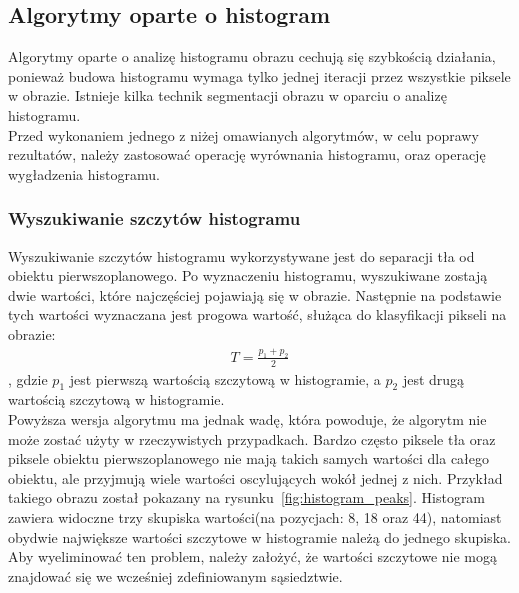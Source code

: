 \subsection{Algorytmy oparte o histogram}
Algorytmy oparte o analizę histogramu obrazu cechują się szybkością działania, ponieważ budowa histogramu wymaga tylko jednej iteracji przez wszystkie piksele w obrazie. Istnieje kilka technik segmentacji obrazu w oparciu o analizę histogramu. \\
Przed wykonaniem jednego z niżej omawianych algorytmów, w celu poprawy rezultatów, należy zastosować operację wyrównania histogramu, oraz operację wygładzenia histogramu.

\subsubsection{Wyszukiwanie szczytów histogramu}
Wyszukiwanie szczytów histogramu wykorzystywane jest do separacji tła od obiektu pierwszoplanowego. Po wyznaczeniu histogramu, wyszukiwane zostają dwie wartości, które najczęściej pojawiają się w obrazie. Następnie na podstawie tych wartości wyznaczana jest progowa wartość, służąca do klasyfikacji pikseli na obrazie:
\begin{gather*}
  T = \frac{p_1 + p_2}{2}
\end{gather*}, gdzie $p_1$ jest pierwszą wartością szczytową w histogramie, a $p_2$ jest drugą wartością szczytową w histogramie. \\
Powyższa wersja algorytmu ma jednak wadę, która powoduje, że algorytm nie może zostać użyty w rzeczywistych przypadkach. Bardzo często piksele tła oraz piksele obiektu pierwszoplanowego nie mają takich samych wartości dla całego obiektu, ale przyjmują wiele wartości oscylujących wokół jednej z nich. Przykład takiego obrazu został pokazany na rysunku~\ref{fig:histogram_peaks}. Histogram zawiera widoczne trzy skupiska wartości(na pozycjach: 8, 18 oraz 44), natomiast obydwie największe wartości szczytowe w histogramie należą do jednego skupiska. Aby wyeliminować ten problem, należy założyć, że wartości szczytowe nie mogą znajdować się we wcześniej zdefiniowanym sąsiedztwie. 
